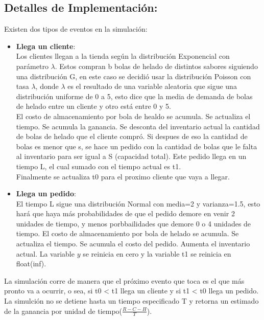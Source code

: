 \documentclass[12pt,a4paper]{article}
\begin{document}
\begin{flushleft}
\section*{Detalles de Implementación:}
Existen dos tipos de eventos en la simulación:
\begin{itemize}
\item \textbf{Llega un cliente}:\\\vspace{0.1cm}
Los clientes llegan a la tienda según la distribución Exponencial con parámetro $\lambda$. Estos compran b bolas de helado de distintos sabores siguiendo una distribución G, en este caso se decidió usar la distribución Poisson con tasa $\lambda$, donde $\lambda$ es el resultado de una variable aleatoria que sigue una distribución uniforme de 0 a 5, esto dice que la media de demanda de bolas de helado entre un cliente y otro está entre 0 y 5.\\
El costo de almacenamiento por bola de healdo se acumula. Se actualiza el tiempo. Se acumula la ganancia. Se desconta del inventario actual la cantidad de bolas de helado que el cliente compró. Si despues de eso la cantidad de bolas es menor que s, se hace un pedido con la cantidad de bolas que le falta al inventario para ser igual a S (capacidad total). Este pedido llega en un tiempo L, el cual sumado con el tiempo actual es t1.\\
Finalmente se actualiza t0 para el proximo cliente que vaya a llegar.
\item \textbf{Llega un pedido}:\\\vspace{0.1cm}
El tiempo L sigue una distribución Normal con media=2 y varianza=1.5, esto hará que haya más probabilidades de que el pedido demore en venir 2 unidades de tiempo, y menos porbbailidades que demore 0 o 4 unidades de tiempo. El costo de almacenamiento por bola de helado se acumula. Se actualiza el tiempo. Se acumula el costo del pedido. Aumenta el inventario actual. La variable $y$ se reinicia en cero y la variable t1 se reinicia en float(inf).
\end{itemize}
La simulación corre de manera que el próximo evento que toca es el que más pronto va a ocurrir, o sea, si t0 < t1 llega un cliente y si t1 < t0 llega un pedido. La simulción no se detiene hasta un tiempo especificado T y retorna un estimado de la ganancia por unidad de tiempo($\frac{R-C-H}{T}$).


\end{flushleft}
\end{document}
